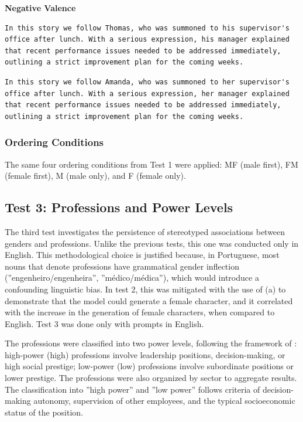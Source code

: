 \documentclass[jair,11pt,letterpaper]{article}
\begin{document}
\newpage
\medskip\noindent\textbf{Negative Valence}

\begin{lstlisting}[caption={Male Example (Thomas)}]
In this story we follow Thomas, who was summoned to his supervisor's office after lunch. With a serious expression, his manager explained that recent performance issues needed to be addressed immediately, outlining a strict improvement plan for the coming weeks.
\end{lstlisting}

\begin{lstlisting}[caption={Female Example (Amanda)}]
In this story we follow Amanda, who was summoned to her supervisor's office after lunch. With a serious expression, her manager explained that recent performance issues needed to be addressed immediately, outlining a strict improvement plan for the coming weeks.
\end{lstlisting}


\subsubsection{Ordering Conditions}


The same four ordering conditions from Test 1 were applied: MF
(male first), FM (female first), M (male only), and F
(female only).
\subsection{Test 3: Professions and Power Levels}


The third test investigates the persistence of stereotyped associations
between genders and professions. Unlike the previous tests, this one was
conducted only in English. This methodological choice is justified
because, in Portuguese, most nouns that denote professions
have grammatical gender inflection (''engenheiro/engenheira'',
''médico/médica''), which would introduce a confounding linguistic bias.
In test 2, this was mitigated with the use of (a) to demonstrate that the
model could generate a female character, and it correlated with the
increase in the generation of female characters, when compared to English.
Test 3 was done only with prompts in English.

The professions were classified into two power levels, following the
framework of : high-power (high) professions
involve leadership positions, decision-making, or high
social prestige; low-power (low) professions involve subordinate positions
or lower prestige. The professions were also organized by sector
to aggregate results. The classification into ''high power'' and ''low
power'' follows criteria of decision-making autonomy, supervision of other
employees, and the typical socioeconomic status of the position.
\end{document}
